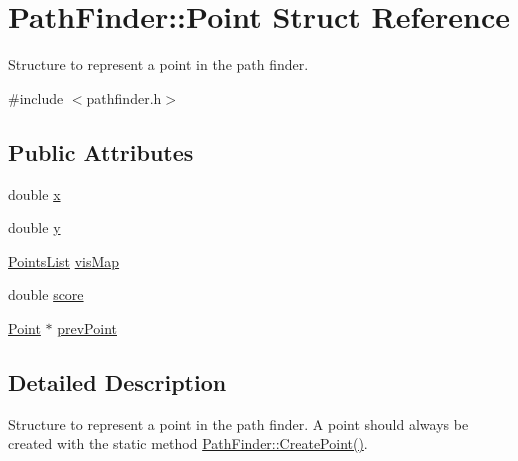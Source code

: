 \hypertarget{structPathFinder_1_1Point}{
\section{PathFinder::Point Struct Reference}
\label{structPathFinder_1_1Point}
}


Structure to represent a point in the path finder.  




{\ttfamily \#include $<$pathfinder.h$>$}

\subsection*{Public Attributes}
\begin{DoxyCompactItemize}
\item 
double \hyperlink{structPathFinder_1_1Point_a1be04f9eff0baa49c0e079f203c485f1}{x}
\item 
double \hyperlink{structPathFinder_1_1Point_a4e29ec03f42f8c196500ed6482ff2c78}{y}
\item 
\hyperlink{classPathFinder_a792a34ce673309f873090141c3d96f1c}{PointsList} \hyperlink{structPathFinder_1_1Point_a8d0aee1e967e4a319b2cb78e116ec66f}{visMap}
\item 
double \hyperlink{structPathFinder_1_1Point_a56c732ebd9055f0f74fade3b63cfdd46}{score}
\item 
\hyperlink{structPathFinder_1_1Point}{Point} $\ast$ \hyperlink{structPathFinder_1_1Point_a838fc3da5494344ab8fcdd5e6fea6173}{prevPoint}
\end{DoxyCompactItemize}


\subsection{Detailed Description}
Structure to represent a point in the path finder. A point should always be created with the static method \hyperlink{classPathFinder_a457592f3579bbe0c0527360c2c8a928a}{PathFinder::CreatePoint()}. 

